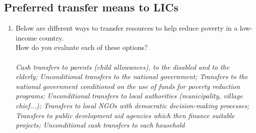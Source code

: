  \subsection*{Preferred transfer means to LICs} 
 \begin{enumerate}[resume] 
\item  \label{q:transfer_how} Below are different ways to transfer resources to help reduce poverty in a low-income country.\~\\How do you evaluate each of these options?\\ [\textit{Figure \ref{fig:transfer_how}}; 
\verb|transfer_how|]
  \\ \textit{Cash transfers to parents (child allowances), to the disabled and to the elderly; Unconditional transfers to the national government; Transfers to the national government conditioned on the use of funds for poverty reduction programs; Unconditional transfers to local authorities (municipality, village chief...); Transfers to local NGOs with democratic decision-making processes; Transfers to public development aid agencies which then finance suitable projects; Unconditional cash transfers to each household}

\end{enumerate} 

